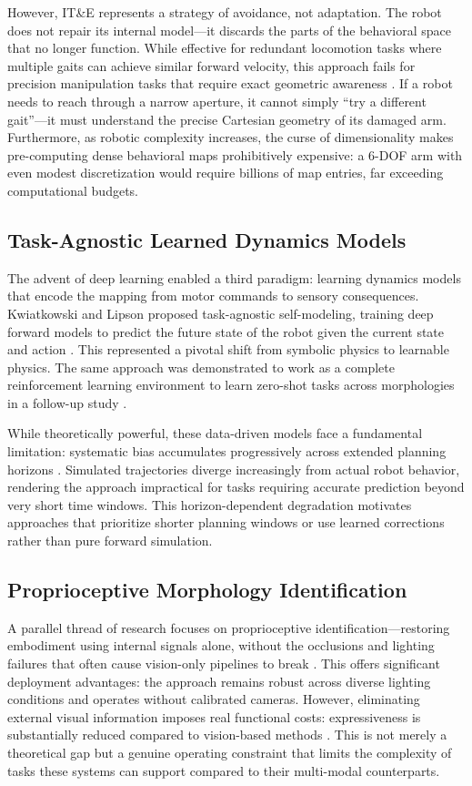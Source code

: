 \documentclass[12pt,a4paper,oneside]{report}
\begin{document}
However, IT\&E represents a strategy of avoidance, not adaptation. The robot does not repair its internal model---it discards the parts of the behavioral space that no longer function. While effective for redundant locomotion tasks where multiple gaits can achieve similar forward velocity, this approach fails for precision manipulation tasks that require exact geometric awareness \cite{kwiatkowski2019task}. If a robot needs to reach through a narrow aperture, it cannot simply ``try a different gait''---it must understand the precise Cartesian geometry of its damaged arm. Furthermore, as robotic complexity increases, the curse of dimensionality makes pre-computing dense behavioral maps prohibitively expensive: a 6-DOF arm with even modest discretization would require billions of map entries, far exceeding computational budgets.

\subsection{Task-Agnostic Learned Dynamics Models}
The advent of deep learning enabled a third paradigm: learning dynamics models that encode the mapping from motor commands to sensory consequences. Kwiatkowski and Lipson proposed task-agnostic self-modeling, training deep forward models to predict the future state of the robot given the current state and action \cite{kwiatkowski2019task}. This represented a pivotal shift from symbolic physics to learnable physics. The same approach was demonstrated to work as a complete reinforcement learning environment to learn zero-shot tasks across morphologies in a follow-up study \cite{kwiatkowski2019zeroshot}.

While theoretically powerful, these data-driven models face a fundamental limitation: systematic bias accumulates progressively across extended planning horizons \cite{kwiatkowski2019task}. Simulated trajectories diverge increasingly from actual robot behavior, rendering the approach impractical for tasks requiring accurate prediction beyond very short time windows. This horizon-dependent degradation motivates approaches that prioritize shorter planning windows or use learned corrections rather than pure forward simulation.

\subsection{Proprioceptive Morphology Identification}
A parallel thread of research focuses on proprioceptive identification---restoring embodiment using internal signals alone, without the occlusions and lighting failures that often cause vision-only pipelines to break \cite{hu2024reconfigurable}. This offers significant deployment advantages: the approach remains robust across diverse lighting conditions and operates without calibrated cameras. However, eliminating external visual information imposes real functional costs: expressiveness is substantially reduced compared to vision-based methods \cite{farghdani2025robust}. This is not merely a theoretical gap but a genuine operating constraint that limits the complexity of tasks these systems can support compared to their multi-modal counterparts.
\end{document}
